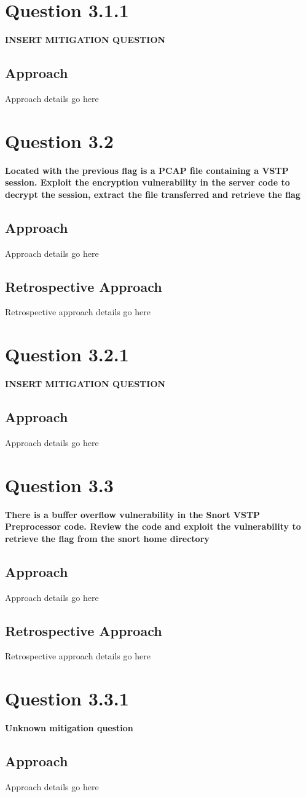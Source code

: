 \section{Question 3.1.1}
\textbf{INSERT MITIGATION QUESTION}
\subsection{Approach}
Approach details go here

\section{Question 3.2}
\textbf{Located with the previous flag is a PCAP file containing a VSTP session.
Exploit the encryption vulnerability in the server code to decrypt the session,
extract the file transferred and retrieve the flag}
\subsection{Approach}
Approach details go here
\subsection{Retrospective Approach}
Retrospective approach details go here

\section{Question 3.2.1}
\textbf{INSERT MITIGATION QUESTION}
\subsection{Approach}
Approach details go here

\section{Question 3.3}
\textbf{There is a buffer overflow vulnerability in the Snort VSTP Preprocessor
code. Review the code and exploit the vulnerability to retrieve the flag from
the snort home directory}
\subsection{Approach}
Approach details go here
\subsection{Retrospective Approach}
Retrospective approach details go here

\section{Question 3.3.1}
\textbf{Unknown mitigation question}
\subsection{Approach}
Approach details go here
